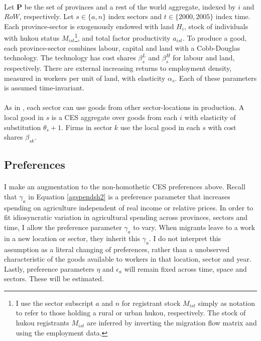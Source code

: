 \documentclass[]{article}
\theoremstyle{plain}
\begin{document}
\paragraph*{}
Let $\mathbf{P}$ be the set of provinces and a rest of the world aggregate, indexed by $i$ and $RoW$, respectively. Let $s \in \{a, n\}$ index sectors and $t \in \{2000, 2005\}$ index time. Each province-sector is exogenously endowed with land $H_{i}$,  stock of individuals with hukou status $M_{ist}$\footnote{I use the sector subscript $a$ and $n$ for registrant stock $M_{ist}$ simply as notation to refer to those holding a rural or urban hukou, respectively. The stock of hukou registrants $M_{ist}$ are inferred by inverting the migration flow matrix and using the employment data.}, and total factor productivity $a_{ist}$. To produce a good, each province-sector combines labour, capital and land with a Cobb-Douglas technology. The technology has cost shares $\beta^{L}_{s}$ and $\beta^{H}_{s}$ for labour and land, respectively. There are external increasing returns to employment density, measured in workers per unit of land, with elasticity $\alpha_{s}$.  Each of these parameters is assumed time-invariant. 
\paragraph*{}
 As in \cite{caliendoparro}, each sector can use goods from other sector-locations in production. A local good in $s$ is a CES aggregate over goods from each $i$ with elasticity of substitution $\theta_{s} + 1$. Firms in sector $k$ use the local good in each $s$ with cost shares $\beta_{sk}$.

\subsection*{Preferences}
\paragraph{}
I make an augmentation to the non-homothetic CES preferences above. Recall that $\gamma_{a}$ in Equation \eqref{agspendsh2} is a preference parameter that increases spending on agriculture independent of real income or relative prices. In order to fit idiosyncratic variation in agricultural spending across provinces, sectors and time, I allow the preference parameter $\gamma_{a}$ to vary. When migrants leave to a work in a new location or sector, they inherit this $\gamma_{a}$. I do not interpret this assumption as a literal changing of preferences, rather than a unobserved characteristic of the goods available to workers in that location, sector and year. Lastly, preference parameters $\eta$ and $\epsilon_{a}$ will remain fixed across time, space and sectors. These will be estimated. 
\end{document}
